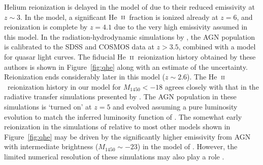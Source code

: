 \documentclass[fleqn,usenatbib]{mnras}
\def\HeII{\hbox{He~$\scriptstyle\rm II$}}
\begin{document}
      Helium reionization is delayed in the model of
      \citet{2012ApJ...746..125H} due to their reduced emissivity at $z\sim
      3$.  In the \citet{2015ApJ...813L...8M} model, a significant
      \HeII\ fraction is ionized already at $z=6$, and reionization is
      complete by $z=4.1$ due to the very high emissivity assumed in this
      model.  In the radiation-hydrodynamic simulations by
      \citet{2016ApJ...828...90L}, the AGN population is calibrated to the
      SDSS \citep{2013ApJ...768..105M} and COSMOS
      \citep{2012ApJ...755..169M} data at $z>3.5$, combined with a model for
      quasar light curves.  The fiducial \HeII\ reionization history
      obtained by these authors is shown in Figure~\ref{fig:qhe} along with
      an estimate of the uncertainty.  Reionization ends considerably later
      in this model ($z\sim 2.6$).  The \HeII\ reionization history in our
      model for $M_\mathrm{1450}<-18$ agrees closely with that in the
      radiative transfer simulations presented by
      \citet{2014MNRAS.445.4186C}.  The AGN population in these simulations
      is `turned on' at $z=5$ and evolved assuming a pure luminosity
      evolution to match the inferred luminosity function of
      \citet{2011ApJ...728L..26G}.  The somewhat early reionization in the
      simulations of \citet{2014MNRAS.445.4186C} relative to most other
      models shown in Figure~\ref{fig:qhe} may be driven by the
      significantly higher emissivity from AGN with intermediate brightness
      ($M_{1450}\sim -23$) in the model of \citet{2011ApJ...728L..26G}.
      However, the limited numerical resolution of these simulations may
      also play a role \citep{2014MNRAS.445.4186C}.
\end{document}
